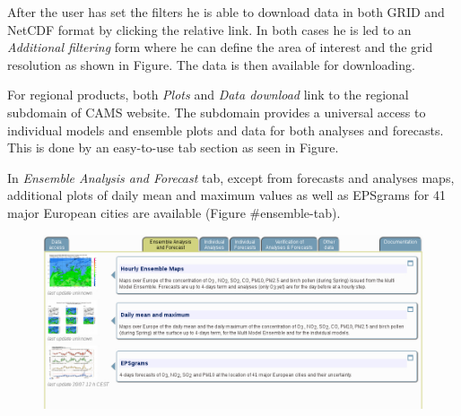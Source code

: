 \documentclass[9pt]{report}
\begin{document}
After the user has set the filters he is able to download data in both GRID and NetCDF format by clicking the relative link.
In both cases he is led to an \emph{Additional filtering} form where he can define the area of interest and the grid resolution as shown in Figure.
The data is then available for downloading.%

For regional products, both \emph{Plots} and \emph{Data download} link to the regional subdomain of CAMS website.
The subdomain provides a universal access to individual models and ensemble plots and data for both analyses and forecasts.
This is done by an easy-to-use tab section as seen in Figure.%

In \emph{Ensemble Analysis and Forecast} tab, except from forecasts and analyses maps, additional plots of daily mean and maximum values as well as EPSgrams for 41 major European cities are available (Figure \#ensemble-tab).%

\begin{figure}[h!]%
\begin{mdcenter}%

\noindent{}\includegraphics[keepaspectratio=true,width=\dimmin{}{\dimwidth{0.90}}]{images/ensemble_tab}{}%

\mdhr{}%

\noindent{}%
\end{mdcenter}\label{ensemble-tab}%
\end{figure}%
\end{document}
